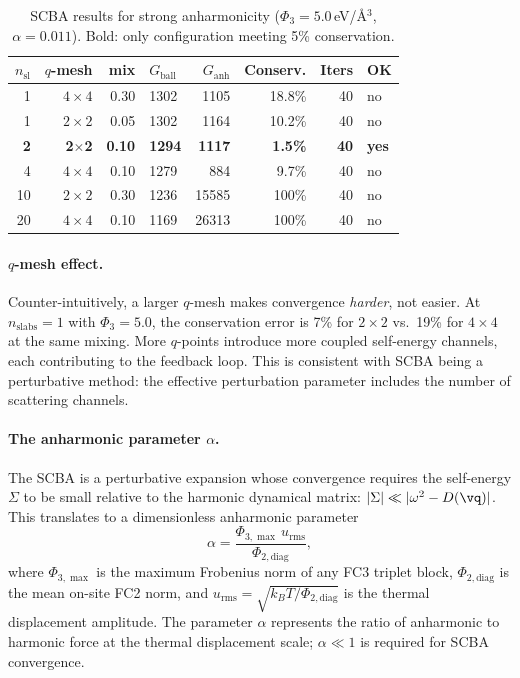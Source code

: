 \begin{table}[h]
  \centering
  \caption{SCBA results for strong anharmonicity
    ($\Phi_3 = 5.0$\,eV/\AA$^3$, $\alpha = 0.011$).
    Bold: only configuration meeting 5\% conservation.}
  \label{tab:toy_strong}
  \begin{tabular}{rrrlrrrl}
    \toprule
    $n_\mathrm{sl}$ & $q$-mesh & mix & $G_\mathrm{ball}$
      & $G_\mathrm{anh}$ & Conserv. & Iters & OK \\
    \midrule
    1 & $4\times 4$ & 0.30 & 1302 & 1105 & 18.8\% & 40 & no \\
    1 & $2\times 2$ & 0.05 & 1302 & 1164 & 10.2\% & 40 & no \\
    \textbf{2} & \textbf{2$\times$2} & \textbf{0.10}
      & \textbf{1294} & \textbf{1117} & \textbf{1.5\%}
      & \textbf{40} & \textbf{yes} \\
    4 & $4\times 4$ & 0.10 & 1279 &  884 & 9.7\%  & 40 & no \\
    10 & $2\times 2$ & 0.30 & 1236 & 15585 & 100\% & 40 & no \\
    20 & $4\times 4$ & 0.10 & 1169 & 26313 & 100\% & 40 & no \\
    \bottomrule
  \end{tabular}
\end{table}

\paragraph{$q$-mesh effect.}
Counter-intuitively, a larger $q$-mesh makes convergence \emph{harder},
not easier.  At $n_\mathrm{slabs} = 1$ with $\Phi_3 = 5.0$, the
conservation error is 7\% for $2\times 2$ vs.\ 19\% for
$4\times 4$ at the same mixing.  More $q$-points introduce more
coupled self-energy channels, each contributing to the feedback loop.
This is consistent with SCBA being a perturbative method: the
effective perturbation parameter includes the number of scattering
channels.

\paragraph{The anharmonic parameter $\alpha$.}
The SCBA is a perturbative expansion whose convergence requires the
self-energy $\Sigma$ to be small relative to the harmonic dynamical
matrix: $|\Sigma| \ll |\omega^2 - D(\vq)|$.  This translates to a
dimensionless anharmonic parameter
\begin{equation}\label{eq:alpha}
  \alpha = \frac{\Phi_{3,\max}\,u_\mathrm{rms}}{\Phi_{2,\mathrm{diag}}},
\end{equation}
where $\Phi_{3,\max}$ is the maximum Frobenius norm of any FC3 triplet
block, $\Phi_{2,\mathrm{diag}}$ is the mean on-site FC2 norm, and
$u_\mathrm{rms} = \sqrt{k_B T / \Phi_{2,\mathrm{diag}}}$ is the
thermal displacement amplitude.  The parameter $\alpha$ represents the
ratio of anharmonic to harmonic force at the thermal displacement
scale; $\alpha \ll 1$ is required for SCBA convergence.

